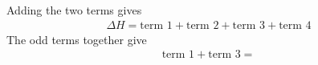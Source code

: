\documentclass[12pt]{article}
\begin{document}
Adding the two terms gives
\begin{equation}\begin{aligned}
	\Delta H = \text{term 1} + \text{term 2} + \text{term 3} + \text{term 4}
\end{aligned}\end{equation}
The odd terms together give
\begin{equation}\begin{aligned}
	\text{term 1} + \text{term 3} =
\end{aligned}\end{equation}
\end{document}
